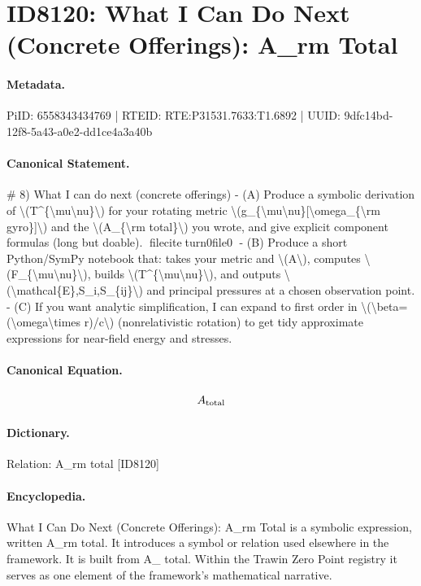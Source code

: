 \section*{ID8120: What I Can Do Next (Concrete Offerings): A\_rm Total}
\paragraph{Metadata.}
PiID: 6558343434769 | RTEID: RTE:P31531.7633:T1.6892 | UUID: 9dfc14bd-12f8-5a43-a0e2-dd1ce4a3a40b

\paragraph{Canonical Statement.}
\# 8) What I can do next (concrete offerings) - (A) Produce a symbolic derivation of \textbackslash{}(T\textasciicircum{}\{\textbackslash{}mu\textbackslash{}nu\}\textbackslash{}) for your rotating metric \textbackslash{}(g\_\{\textbackslash{}mu\textbackslash{}nu\}[\textbackslash{}omega\_\{\textbackslash{}rm gyro\}]\textbackslash{}) and the \textbackslash{}(A\_\{\textbackslash{}rm total\}\textbackslash{}) you wrote, and give explicit component formulas (long but doable). fileciteturn0file0 - (B) Produce a short Python/SymPy notebook that: takes your metric and \textbackslash{}(A\textbackslash{}), computes \textbackslash{}(F\_\{\textbackslash{}mu\textbackslash{}nu\}\textbackslash{}), builds \textbackslash{}(T\textasciicircum{}\{\textbackslash{}mu\textbackslash{}nu\}\textbackslash{}), and outputs \textbackslash{}(\textbackslash{}mathcal\{E\},S\_i,S\_\{ij\}\textbackslash{}) and principal pressures at a chosen observation point. - (C) If you want analytic simplification, I can expand to first order in \textbackslash{}(\textbackslash{}beta=(\textbackslash{}omega\textbackslash{}times r)/c\textbackslash{}) (nonrelativistic rotation) to get tidy approximate expressions for near-field energy and stresses.

\paragraph{Canonical Equation.}
\[
A_{\rm total}
\]

\paragraph{Dictionary.}
Relation: A\_rm total [ID8120]

\paragraph{Encyclopedia.}
What I Can Do Next (Concrete Offerings): A\_rm Total is a symbolic expression, written A\_rm total. It introduces a symbol or relation used elsewhere in the framework. It is built from A\_ total. Within the Trawin Zero Point registry it serves as one element of the framework's mathematical narrative.

